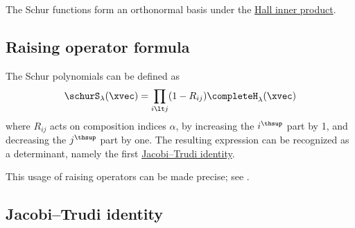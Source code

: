 The Schur functions form an orthonormal basis under the
\hyperref[hallInnerProduct]{Hall inner product}.


\subsection[schurRaisingFormula]{Raising operator formula}

The Schur polynomials can be defined as
\[
\schurS_\lambda(\xvec) = \prod_{i \lt j} (1-R_{ij}) \completeH_{\lambda}(\xvec)
\]
where $R_{ij}$ acts on composition indices $\alpha$, by increasing the $i^\thsup$ part by 1,
and decreasing the $j^\thsup$ part by one.
The resulting expression can be recognized as a determinant, namely the
first \hyperref[schurJacobiTrudi]{Jacobi--Trudi identity}.

This usage of raising operators can be made precise; see \cite{Garsia1992}.


\subsection[schurJacobiTrudi]{Jacobi--Trudi identity}

